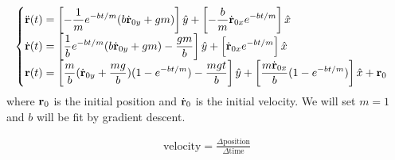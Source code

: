\documentclass[12pt,english]{article}
\begin{document}
\newpage
\begin{align*}
\begin{cases} 
\displaystyle \ddot{\bf r}(t) = \left[-\frac{1}{m}e^{-bt/m}(b\dot{\bf r}_{0y}+gm)\right]\hat{y} + \left[-\frac{b}{m}\dot{\bf r}_{0x}e^{-bt/m}\right]\hat{x} 
\\
\displaystyle \dot{\bf r}(t) = \left[\frac{1}{b}e^{-bt/m}(b\dot{\bf r}_{0y}+gm)-\frac{gm}{b}\right]\hat{y} + \left[\dot{\bf r}_{0x}e^{-bt/m}\right]\hat{x} 
\\
\displaystyle {\bf r}(t) = \left[\frac{m}{b}(\dot{\bf r}_{0y}+\frac{mg}{b})(1-e^{-bt/m})-\frac{mgt}{b}\right]\hat{y} + \left[\frac{m\dot{\bf r}_{0x}}{b}(1-e^{-bt/m})\right]\hat{x} + {\bf r}_0
\end{cases}
\end{align*}
where ${\bf r}_0$ is the initial position and $\dot{\bf r}_0$ is the initial velocity. We will set $m=1$ and $b$ will be fit by gradient descent.

\begin{align*}
\text{velocity} = \frac{\Delta \text{position}}{\Delta \text{time}}
\end{align*}
\end{document}
